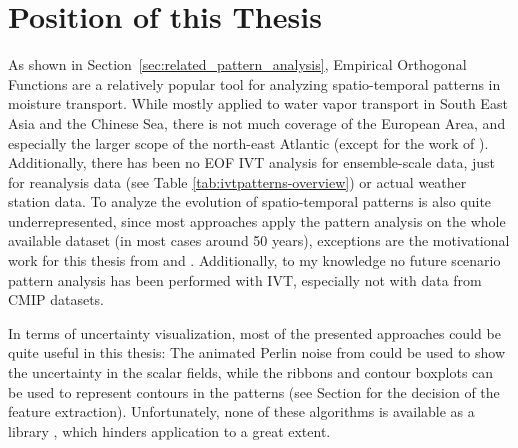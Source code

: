 \section{Position of this Thesis} %
\label{sec:Position of this Thesis}

As shown in Section~\ref{sec:related_pattern_analysis}, Empirical Orthogonal Functions are a relatively popular tool for analyzing spatio-temporal patterns in moisture transport. 
While mostly applied to water vapor transport in South East Asia and the Chinese Sea, there is not much coverage of the European Area, and especially the larger scope of the north-east Atlantic (except for the work of \citeauthor{wypych_atmospheric_2018} \cite{wypych_atmospheric_2018}). 
Additionally, there has been no EOF IVT analysis for ensemble-scale data, just for reanalysis data (see Table \ref{tab:ivtpatterns-overview}) or actual weather station data.
To analyze the evolution of spatio-temporal patterns is also quite underrepresented, since most approaches apply the pattern analysis on the whole available dataset (in most cases around 50 years), exceptions are the motivational work for this thesis from  and . 
Additionally, to my knowledge no future scenario pattern analysis has been performed with IVT, especially not with data from CMIP datasets.  

In terms of uncertainty visualization, most of the presented approaches could be quite useful in this thesis: The animated Perlin noise from \cite{coninx_visualization_2011} could be used to show the uncertainty in the scalar fields, while the ribbons and contour boxplots can be used to represent contours in the patterns (see Section  for the decision of the feature extraction). 
Unfortunately, none of these algorithms is available as a library , which hinders application to a great extent. 


